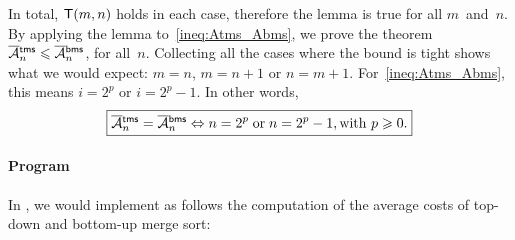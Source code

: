 In total, \(\textsf{T}({m,n})\) holds in each case, therefore the lemma is
true for all \(m\)~and~\(n\). By applying the lemma
to~\eqref{ineq:Atms_Abms}, we prove the theorem \(\OM{\fun{tms}}{n}
\leqslant \OM{\fun{bms}}{n}\), for all~\(n\). Collecting all the cases
where the bound is tight shows what we would expect: \(m=n\),
\(m=n+1\) or \(n=m+1\). For~\eqref{ineq:Atms_Abms}, this means
\(i=2^p\) or \(i=2^p-1\). In other words,
\begin{equation*}
\boxed{\OM{\fun{tms}}{n} = \OM{\fun{bms}}{n} \Leftrightarrow n=2^p
  \;\text{or}\; n=2^p-1, \text{with \(p \geqslant
    0\)}.}
\end{equation*}

\paragraph{Program}

In \Erlang, we would implement as follows the computation of the
average costs of top\hyp{}down and bottom\hyp{}up merge sort:


